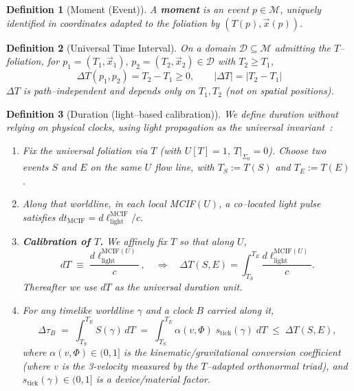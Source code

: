 \documentclass[12pt]{article}
\newtheorem{definition}{Definition}
\theoremstyle{plain}
\newcommand{\stick}{s_{\mathrm{tick}}}
\begin{document}
\begin{definition}[Moment (Event)]
A \textbf{moment} is an event $p\in\mathcal{M}$, uniquely identified in coordinates adapted to the foliation by $(T(p),\vec{x}(p))$.
\end{definition}

\begin{definition}[Universal Time Interval]
On a domain $\mathcal{D}\subseteq\mathcal{M}$ admitting the $T$–foliation, for $p_1=(T_1,\vec{x}_1),\,p_2=(T_2,\vec{x}_2)\in\mathcal{D}$ with $T_2\ge T_1$,
\begin{equation}
\Delta T(p_1,p_2)=T_2-T_1\ge 0,\qquad |\Delta T|=|T_2-T_1|
\label{eq:DeltaT}
\end{equation}
$\Delta T$ is path–independent and depends only on $T_1,T_2$ (not on spatial positions).
\end{definition}

\begin{definition}[Duration (light–based calibration)]
We define duration without relying on physical clocks, using light propagation as the universal invariant~\cite{Einstein1905,Rindler2006}:

\begin{enumerate}
    \item Fix the universal foliation via $T$ (with $U[T]=1$, $T|_{\Sigma_0}=0$). Choose two events $S$ and $E$ on the same $U$ flow line, with $T_S:=T(S)$ and $T_E:=T(E)$.
    \item Along that worldline, in each local MCIF$(U)$, a co–located light pulse satisfies $dt_{\mathrm{MCIF}} = d\ell_{\mathrm{light}}^{\mathrm{MCIF}}/c$.
    \item \textbf{Calibration of $T$.} We affinely fix $T$ so that along $U$,
    \begin{equation}
    dT \;\equiv\; \frac{d\ell_{\mathrm{light}}^{\mathrm{MCIF}(U)}}{c}\,,
    \quad\Rightarrow\quad
    \Delta T(S,E)=\int_{T_S}^{T_E}\frac{d\ell_{\mathrm{light}}^{\mathrm{MCIF}(U)}}{c}.
    \label{eq:calibration}
    \end{equation}
    Thereafter we use $dT$ as the universal duration unit.
    \item For any timelike worldline $\gamma$ and a clock $B$ carried along it,
    \begin{equation}
    \Delta\tau_B
    \;=\;
    \int_{T_S}^{T_E} S(\gamma)\, dT
    \;=\;
    \int_{T_S}^{T_E} \alpha(v,\Phi)\; \stick(\gamma)\; dT
    \;\le\; \Delta T(S,E),
    \label{eq:duration}
    \end{equation}
    where $\alpha(v,\Phi)\in(0,1]$ is the kinematic/gravitational conversion coefficient (where $v$ is the 3-velocity measured by the $T$–adapted orthonormal triad), and $\stick(\gamma)\in(0,1]$ is a device/material factor.
\end{enumerate}
\end{definition}
\end{document}
